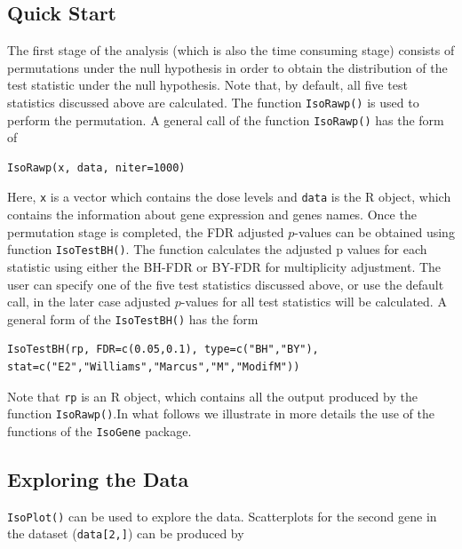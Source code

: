 \documentclass[10pt]{mybook4}
\newenvironment{boxit}{\begin{lrbox}{\savepar}
\begin{minipage}[b]{5.0in}}
{\end{minipage}\end{lrbox}\fbox{\usebox{\savepar}}}
\begin{document}
\subsection{Quick Start}
The first stage of the analysis (which is also the time consuming stage) consists of permutations under the null hypothesis in order to obtain the distribution of the test statistic under the null hypothesis. Note that, by default, all five test statistics discussed above are calculated. The function \texttt{IsoRawp()} is used to perform the permutation. A general call of the function \texttt{IsoRawp()} has the form of
\begin{center}
\begin{boxit}
\begin{verbatim}
IsoRawp(x, data, niter=1000)
\end{verbatim}
\end{boxit}
\end{center}
Here, \texttt{x} is a vector which contains the dose levels and \texttt{data} is the R object, which contains the information about gene expression and genes names. Once the permutation stage is completed, the FDR adjusted $p$-values can be obtained using function \texttt{IsoTestBH()}. The function calculates the adjusted p values for each statistic using either the BH-FDR or BY-FDR for multiplicity adjustment. The user can specify one of the five test statistics discussed above, or use the default call, in the later case adjusted $p$-values for all test statistics will be calculated. A general form of the \texttt{IsoTestBH()} has the form
\begin{center}
\begin{boxit}
\begin{verbatim}
IsoTestBH(rp, FDR=c(0.05,0.1), type=c("BH","BY"),
stat=c("E2","Williams","Marcus","M","ModifM"))
\end{verbatim}
\end{boxit}
\end{center}
Note that \texttt{rp} is an R object, which contains all the output produced by the function \texttt{IsoRawp()}.\newline In what follows we illustrate in more details the use of the functions of the \texttt{IsoGene} package.

\subsection{Exploring the Data}

\texttt{IsoPlot()} can be used to explore the data. Scatterplots for the
second gene in the dataset (\texttt{data[2,]}) can be produced by
\end{document}
